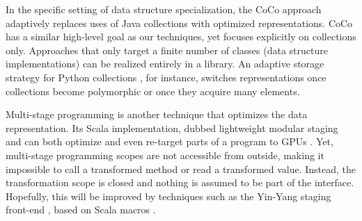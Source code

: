 In the specific setting of data structure specialization, the CoCo
approach~\cite{Xu:2013:CSA:2524984.2524986} adaptively replaces uses
of Java collections with optimized representations.  CoCo has a
similar high-level goal as our techniques, yet focuses explicitly on
collections only.  Approaches that only target a finite number of
classes (data structure implementations) can be realized entirely in a
library. An adaptive storage strategy for Python collections
\cite{Bolz:2013:SSC:2509136.2509531}, for instance, switches
representations once collections become polymorphic or once they
acquire many elements.

Multi-stage programming \cite{taha-intro} is another technique that
optimizes the data representation. Its Scala implementation, dubbed
lightweight modular staging and can both optimize and even re-target parts of a
program to GPUs \cite{tiark-lms,delite}. Yet, multi-stage programming
scopes are not accessible from outside, making it impossible to call
a transformed method or read a transformed value. Instead, the transformation
scope is closed and nothing is assumed to be part of the interface.
Hopefully, this will be improved by techniques such as the Yin-Yang
staging front-end \cite{vojin-yy}, based on Scala macros \cite{eugene-macros}.
